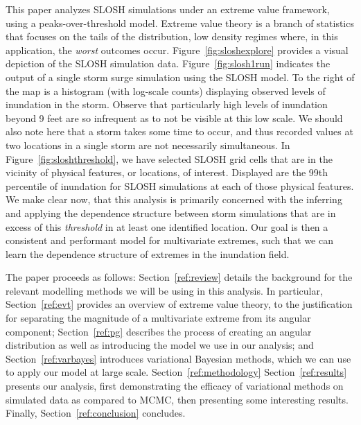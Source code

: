 This paper analyzes SLOSH simulations under an extreme value framework, using a
    peaks-over-threshold model.  Extreme value theory is a branch of statistics
    that focuses on the tails of the distribution, low density regimes where,
    in this application, the \emph{worst} outcomes occur.  
    Figure~\ref{fig:sloshexplore} provides a visual depiction of the SLOSH 
    simulation data.  Figure~\ref{fig:slosh1run} indicates the output of a single 
    storm surge simulation using the SLOSH model. To the right of the map is a 
    histogram (with log-scale counts) displaying observed levels of inundation 
    in the storm.  Observe that particularly high levels of inundation beyond 9 
    feet are so infrequent as to not be visible at this low scale. We should also 
    note here that a storm takes some time to occur, and thus recorded values at 
    two locations in a single storm are not necessarily simultaneous.
    In Figure~\ref{fig:sloshthreshold}, we have selected SLOSH grid 
    cells that are in the vicinity of physical features, or locations, of 
    interest.  Displayed are the 99th percentile 
    of inundation for SLOSH simulations at each of those physical features.
    We make clear now, that this analysis is primarily concerned with the
    inferring and applying the dependence structure between storm simulations
    that are in excess of this \emph{threshold} in at least one identified location.
    Our goal is then a consistent and performant model for multivariate extremes, 
    such that we can learn the dependence structure of extremes in the inundation field.


The paper proceeds as follows:  Section~\ref{ref:review} details the background 
    for the relevant modelling methods we will be using in this analysis.  In 
    particular, Section~\ref{ref:evt} 
    provides an overview of extreme value theory, to the justification for 
    separating the magnitude of a multivariate extreme from its angular 
    component; Section~\ref{ref:pg} describes the process of creating an angular 
    distribution as well as introducing the model we use in our analysis; and 
    Section~\ref{ref:varbayes} introduces variational Bayesian methods, which we 
    can use to apply our model at large scale.  Section~\ref{ref:methodology} 
    Section~\ref{ref:results} presents our analysis, first demonstrating the 
    efficacy of variational methods on simulated data as compared to MCMC, then
    presenting some interesting results. Finally, Section~\ref{ref:conclusion} 
    concludes.

